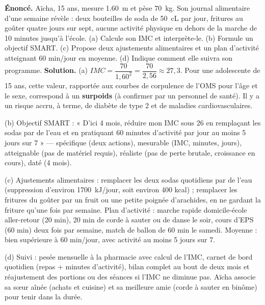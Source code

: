 \documentclass[11pt]{article}
\begin{document}
\begin{exoresolu}
\textbf{Énoncé.} Aïcha, 15 ans, mesure \SI{1,60}{m} et pèse \SI{70}{kg}. Son journal alimentaire d'une semaine révèle : deux bouteilles de soda de \SI{50}{cL} par jour, fritures au goûter quatre jours sur sept, aucune activité physique en dehors de la marche de 10 minutes jusqu'à l'école. (a) Calcule son IMC et interprète-le. (b) Formule un objectif SMART. (c) Propose deux ajustements alimentaires et un plan d'activité atteignant 60 min/jour en moyenne. (d) Indique comment elle suivra son programme.
\tcblower
\textbf{Solution.}
(a) $IMC = \dfrac{70}{1{,}60^2} = \dfrac{70}{2{,}56} \approx 27{,}3$. Pour une adolescente de 15 ans, cette valeur, rapportée aux courbes de corpulence de l'OMS pour l'âge et le sexe, correspond à un \textbf{surpoids} (à confirmer par un personnel de santé). Il y a un risque accru, à terme, de diabète de type 2 et de maladies cardiovasculaires.

(b) Objectif SMART : « D'ici 4 mois, réduire mon IMC sous 26 en remplaçant les sodas par de l'eau et en pratiquant 60 minutes d'activité par jour au moins 5 jours sur 7 » — spécifique (deux actions), mesurable (IMC, minutes, jours), atteignable (pas de matériel requis), réaliste (pas de perte brutale, croissance en cours), daté (4 mois).

(c) Ajustements alimentaires : remplacer les deux sodas quotidiens par de l'eau (suppression d'environ \SI{1700}{kJ}/jour, soit environ 400 kcal) ; remplacer les fritures du goûter par un fruit ou une petite poignée d'arachides, en ne gardant la friture qu'une fois par semaine. Plan d'activité : marche rapide domicile-école aller-retour (20 min), 20 min de corde à sauter ou de danse le soir, cours d'EPS (60 min) deux fois par semaine, match de ballon de 60 min le samedi. Moyenne : bien supérieure à 60 min/jour, avec activité au moins 5 jours sur 7.

(d) Suivi : pesée mensuelle à la pharmacie avec calcul de l'IMC, carnet de bord quotidien (repas + minutes d'activité), bilan complet au bout de deux mois et réajustement des portions ou des séances si l'IMC ne diminue pas. Aïcha associe sa s\oe ur aînée (achats et cuisine) et sa meilleure amie (corde à sauter en binôme) pour tenir dans la durée.
\end{exoresolu}
\end{document}
